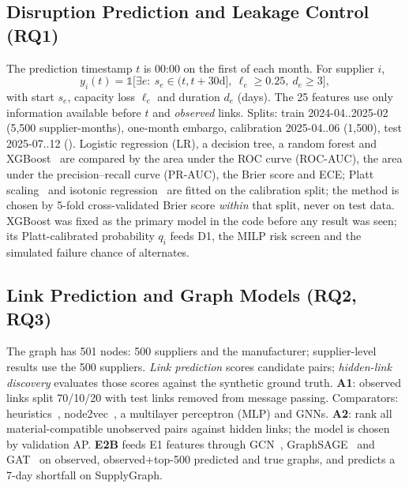 \documentclass[conference]{IEEEtran}
\begin{document}
\subsection{Disruption Prediction and Leakage Control (RQ1)}
The prediction timestamp $t$ is 00:00 on the first of each month. For supplier $i$,
\begin{equation}\label{eq:label}
y_i(t)=\mathbb{1}\big[\exists e:\ s_e\in(t,t+30\mathrm{d}],\ \ell_e\ge0.25,\ d_e\ge3\big],
\end{equation}
with start $s_e$, capacity loss $\ell_e$ and duration $d_e$ (days). The 25 features use only information available before $t$ and \emph{observed}
links. Splits: train 2024-04..2025-02 (5,500 supplier-months), one-month embargo, calibration 2025-04..06 (1,500), test 2025-07..12 (\TestRows).
Logistic regression (LR), a decision tree, a random forest and XGBoost~\cite{chen2016} are compared by the area under the ROC curve (ROC-AUC), the area under the precision--recall curve (PR-AUC), the Brier score and ECE; Platt scaling~\cite{platt1999} and isotonic
regression~\cite{zadrozny2002,niculescu2005} are fitted on the calibration split; the method is chosen by 5-fold cross-validated Brier score
\emph{within} that split, never on test data. XGBoost was fixed as the primary model in the code before any result was seen; its Platt-calibrated
probability $q_i$ feeds D1, the MILP risk screen and the simulated failure chance of alternates.

\subsection{Link Prediction and Graph Models (RQ2, RQ3)}
The graph has 501 nodes: 500 suppliers and the manufacturer; supplier-level results use the 500 suppliers. \emph{Link prediction} scores
candidate pairs; \emph{hidden-link discovery} evaluates those scores against the synthetic ground truth. \textbf{A1}: observed links split
70/10/20 with test links removed from message passing. Comparators: heuristics~\cite{libennowell2007}, node2vec~\cite{grover2016}, a multilayer perceptron (MLP) and GNNs. \textbf{A2}: rank all \LinkCand{} material-compatible unobserved pairs against
\LinkHid{} hidden links; the model is chosen by validation AP. \textbf{E2B} feeds E1 features through GCN~\cite{kipf2017}, GraphSAGE~\cite{hamilton2017} and
GAT~\cite{velickovic2018} on observed, observed+top-500 predicted and true graphs, and predicts a 7-day shortfall on SupplyGraph.
\end{document}

